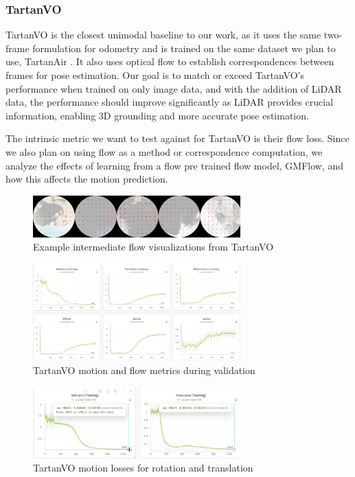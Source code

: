 \documentclass[11pt,a4paper]{article}
\begin{document}
\subsubsection{TartanVO}

TartanVO \cite{tartanvo} is the closest unimodal baseline to our work, as it uses the same two-frame formulation for odometry and is trained on the same dataset we plan to use, TartanAir \cite{tartanair}. It also uses optical flow to establish correspondences between frames for pose estimation. Our goal is to match or exceed TartanVO’s performance when trained on only image data, and with the addition of LiDAR data, the performance should improve significantly as LiDAR provides crucial information, enabling 3D grounding and more accurate pose estimation.

The intrinsic metric we want to test against for TartanVO is their flow loss. Since we also plan on using flow as a method or correspondence computation, we analyze the effects of learning from a flow pre trained flow model, GMFlow, and how this affects the motion prediction.

\begin{figure}[htbp]
    \centering
    \includegraphics[width=8cm]{Reports/3-Analysis-of-Baselines/images/tartanvo/flow_img.png}
    \caption{Example intermediate flow visualizations from TartanVO}
    \label{fig:tvo-flow-img}
\end{figure}

\begin{figure}[htbp]
    \centering
    \includegraphics[width=8cm]{Reports/3-Analysis-of-Baselines/images/tartanvo/flow_loss.png}
    \caption{TartanVO motion and flow metrics during validation}
    \label{fig:tvo-flow-loss}
\end{figure}

\begin{figure}[htbp]
    \centering
    \includegraphics[width=8cm]{Reports/3-Analysis-of-Baselines/images/tartanvo/rot_trans_loss.png}
    \caption{TartanVO motion losses for rotation and translation}
    \label{fig:tvo-rot-trans}
\end{figure}
\end{document}
